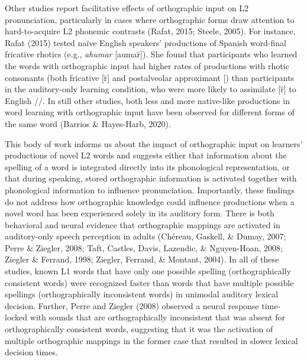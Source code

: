 \documentclass[
  english,
  man,floatsintext]{apa7}
\begin{document}
Other studies report facilitative effects of orthographic input on L2 pronunciation, particularly in cases where orthographic forms draw attention to hard-to-acquire L2 phonemic contrasts (Rafat, 2015; Steele, 2005). For instance, Rafat (2015) tested naïve English speakers' productions of Spanish word-final fricative rhotics (e.g., \emph{ahumar} {[}auma\u{r}{]}). She found that participants who learned the words with orthographic input had higher rates of productions with rhotic consonants (both fricative {[}\u{r}{]} and postalveolar approximant {[}\textturnr{]}) than participants in the auditory-only learning condition, who were more likely to assimilate {[}\u{r}{]} to English /\textesh /. In still other studies, both less and more native-like productions in word learning with orthographic input have been observed for different forms of the same word (Barrios \& Hayes-Harb, 2020).

This body of work informs us about the impact of orthographic input on learners' productions of novel L2 words and suggests either that information about the spelling of a word is integrated directly into its phonological representation, or that during speaking, stored orthographic information is activated together with phonological information to influence pronunciation. Importantly, these findings do not address how orthographic knowledge could influence productions when a novel word has been experienced solely in its auditory form. There is both behavioral and neural evidence that orthographic mappings are activated in auditory-only speech perception in adults (Chéreau, Gaskell, \& Dumay, 2007; Perre \& Ziegler, 2008; Taft, Castles, Davis, Lazendic, \& Nguyen-Hoan, 2008; Ziegler \& Ferrand, 1998; Ziegler, Ferrand, \& Montant, 2004). In all of these studies, known L1 words that have only one possible spelling (orthographically consistent words) were recognized faster than words that have multiple possible spellings (orthographically inconsistent words) in unimodal auditory lexical decision. Further, Perre and Ziegler (2008) observed a neural response time-locked with sounds that are orthographically inconsistent that was absent for orthographically consistent words, suggesting that it was the activation of multiple orthographic mappings in the former case that resulted in slower lexical decision times.
\end{document}
